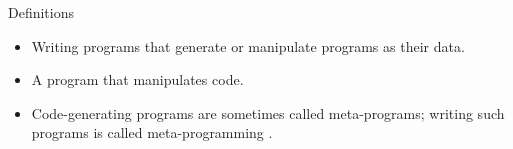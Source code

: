 \begin{frame}{Definitions}
\begin{itemize}
\item Writing programs that generate or manipulate programs as their data.
\vspace{5mm}
\item A program that manipulates code.
\vspace{5mm}
\item Code-generating programs are sometimes called meta-programs; writing such programs
    is called meta-programming \cite{AbrahamsAndGurtovoy04}.
\end{itemize}
\end{frame}


